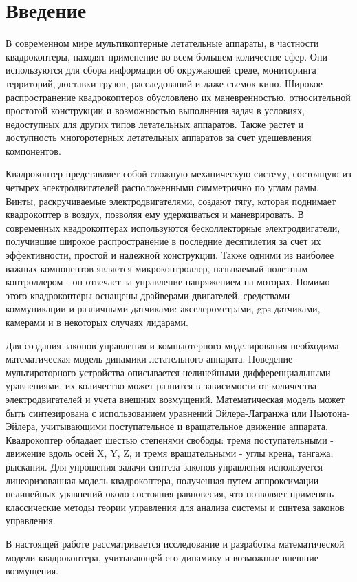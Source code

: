 \chapter*{Введение}
\label{ch:chap1}



В современном мире мультикоптерные летательные аппараты, 
в частности квадрокоптеры, находят применение во всем большем количестве 
сфер. Они используются для сбора информации об окружающей 
среде, мониторинга территорий, доставки грузов, расследований
и даже съемок кино. 
Широкое распространение квадрокоптеров обусловлено 
их маневренностью, относительной простотой конструкции и 
возможностью выполнения задач в условиях, недоступных 
для других типов летательных аппаратов. Также растет и доступность многоротерных 
летательных аппаратов за счет удешевления компонентов.

Квадрокоптер представляет собой сложную механическую систему, состоящую из 
четырех электродвигателей расположенными симметрично по углам рамы. 
Винты, раскручиваемые электродвигателями, создают тягу, которая поднимает квадрокоптер в воздух, 
позволяя ему удерживаться и маневрировать. В современных квадрокоптерах 
используются бесколлекторные электродвигатели, получившие широкое 
распространение в последние десятилетия за счет их эффективности, 
простой и надежной конструкции. Также одними из наиболее важных 
компонентов является микроконтроллер, называемый полетным контроллером - 
он отвечает за управление напряжением на моторах. Помимо этого квадрокоптеры 
оснащены драйверами двигателей, средствами коммуникации и различными датчиками: 
акселерометрами, gps-датчиками, камерами и в некоторых случаях лидарами.

Для создания законов управления и компьютерного моделирования необходима 
математическая модель динамики летательного аппарата. Поведение мультироторного 
устройства описывается нелинейными дифференциальными уравнениями, их 
количество может разнится в зависимости от количества электродвигателей 
и учета внешних возмущений. Математическая модель может быть синтезирована 
с использованием 
уравнений Эйлера-Лагранжа или Ньютона-Эйлера, учитывающими поступательное и 
вращательное движение аппарата.  Квадрокоптер обладает шестью степенями свободы:
тремя поступательными - движение вдоль осей X, Y, Z, и тремя вращательными - углы крена, тангажа, рыскания.
Для упрощения задачи синтеза законов управления  используется 
линеаризованная модель квадрокоптера, полученная путем аппроксимации 
нелинейных уравнений около состояния равновесия, что позволяет применять 
классические методы теории управления для анализа системы и синтеза законов управления.


В настоящей работе рассматривается исследование и разработка 
математической модели квадрокоптера, учитывающей его динамику и возможные внешние
возмущения.



\endinput
